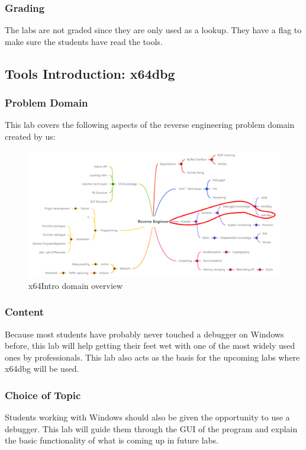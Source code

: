 \subsubsection*{Grading}
The labs are not graded since they are only used as a lookup. They have a flag to make sure the students have read the tools.
\pagebreak

\subsection{Tools Introduction: x64dbg}
\subsubsection*{Problem Domain}
This lab covers the following aspects of the reverse engineering problem domain created by us:
\vspace{-2ex}
\begin{figure}[H]
    \includegraphics[width=\textwidth]{resources/x64Intro-overview-light.png}
    \caption{x64Intro domain overview}
    \label{fig:x64Intro-overview}
\end{figure}
\subsubsection*{Content}
Because most students have probably never touched a debugger on Windows before, this lab will help getting their feet wet with one of the most widely used ones by professionals.
This lab also acts as the basis for the upcoming labs where x64dbg will be used.
\subsubsection*{Choice of Topic}
Students working with Windows should also be given the opportunity to use a debugger. This lab will guide them through the GUI of the program and explain the basic functionality of what is coming up in future labs.
